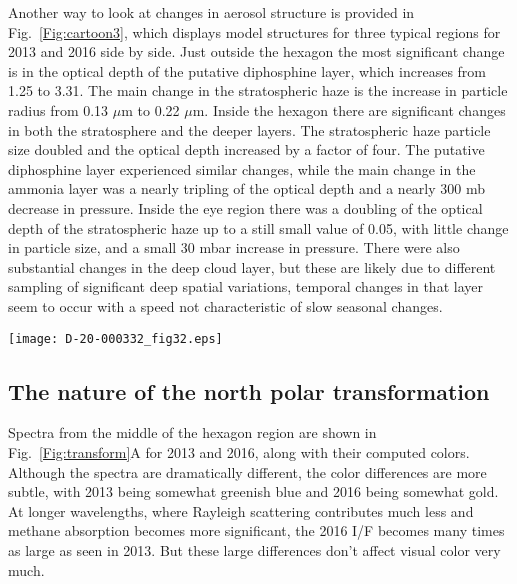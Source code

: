 \documentclass[article,11pt]{emulateapj}
\def\mum{$\mu$m }
\def\mumx{$\mu$m}
\begin{document}
Another way to look at changes in aerosol structure is provided in
Fig.\ \ref{Fig:cartoon3}, which displays model structures for three
typical regions for 2013 and 2016 side by side.  Just outside the
hexagon the most significant change is in the optical depth of the
putative diphosphine layer, which increases from 1.25 to 3.31. The
main change in the stratospheric haze is the increase in particle
radius from 0.13 \mum to 0.22 \mumx.  Inside the hexagon there are
significant changes in both the stratosphere and the deeper layers.
The stratospheric haze particle size doubled and the optical depth
increased by a factor of four.  The putative diphosphine layer
experienced similar changes, while the main change in the ammonia
layer was a nearly tripling of the optical depth and a nearly 300 mb
decrease in pressure.  Inside the eye region there was a doubling of
the optical depth of the stratospheric haze up to a still small value
of 0.05, with little change in particle size, and a small 30 mbar
increase in pressure.  There were also substantial changes in the deep
cloud layer, but these are likely due to different sampling of
significant deep spatial variations, temporal changes in that layer
seem to occur with a speed not characteristic of slow seasonal
changes.


\begin{figure*}[!ht]\centering
\texttt{[image: D-20-000332\_fig32.eps]}
\caption{Best fit model aerosol structures for 2013 and 2016 for three regions: just outside the
hexagon (left pair), in the middle of the hexagon (middle pair) and in the eye (right pair).
Locations and latitudes are indicated at the top of each column.  Error bars indicate the
uncertainties of the base pressure for each layer, which are small for all but the stratospheric layer.
}
\label{Fig:cartoon3}
\end{figure*}


\subsection{The nature of the north polar transformation}

Spectra from the middle of the hexagon region are shown in
Fig.\ \ref{Fig:transform}A for 2013 and 2016, along with their
computed colors.  Although the spectra are dramatically different, the
color differences are more subtle, with 2013 being somewhat greenish
blue and 2016 being somewhat gold.  At longer wavelengths, where
Rayleigh scattering contributes much less and methane absorption
becomes more significant, the 2016 I/F becomes many times as large as
seen in 2013.  But these large differences don't affect visual color
very much.
\end{document}
